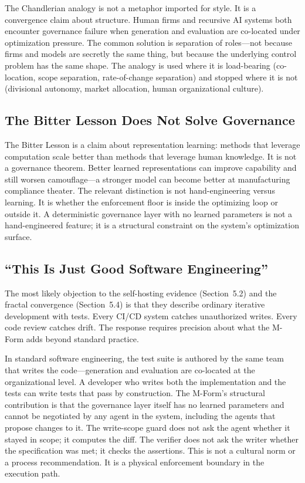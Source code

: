 \documentclass[11pt]{article}
\begin{document}
The Chandlerian analogy is not a metaphor imported for style. It is a convergence claim about structure. Human firms and recursive AI systems both encounter governance failure when generation and evaluation are co-located under optimization pressure. The common solution is separation of roles---not because firms and models are secretly the same thing, but because the underlying control problem has the same shape. The analogy is used where it is load-bearing (co-location, scope separation, rate-of-change separation) and stopped where it is not (divisional autonomy, market allocation, human organizational culture).

\subsection{The Bitter Lesson Does Not Solve Governance}

The Bitter Lesson \citep{sutton2019} is a claim about representation learning: methods that leverage computation scale better than methods that leverage human knowledge. It is not a governance theorem. Better learned representations can improve capability and still worsen camouflage---a stronger model can become better at manufacturing compliance theater. The relevant distinction is not hand-engineering versus learning. It is whether the enforcement floor is inside the optimizing loop or outside it. A deterministic governance layer with no learned parameters is not a hand-engineered feature; it is a structural constraint on the system's optimization surface.

\subsection{``This Is Just Good Software Engineering''}

The most likely objection to the self-hosting evidence (Section~5.2) and the fractal convergence (Section~5.4) is that they describe ordinary iterative development with tests. Every CI/CD system catches unauthorized writes. Every code review catches drift. The response requires precision about what the M-Form adds beyond standard practice.

In standard software engineering, the test suite is authored by the same team that writes the code---generation and evaluation are co-located at the organizational level. A developer who writes both the implementation and the tests can write tests that pass by construction. The M-Form's structural contribution is that the governance layer itself has no learned parameters and cannot be negotiated by any agent in the system, including the agents that propose changes to it. The write-scope guard does not ask the agent whether it stayed in scope; it computes the diff. The verifier does not ask the writer whether the specification was met; it checks the assertions. This is not a cultural norm or a process recommendation. It is a physical enforcement boundary in the execution path.
\end{document}
